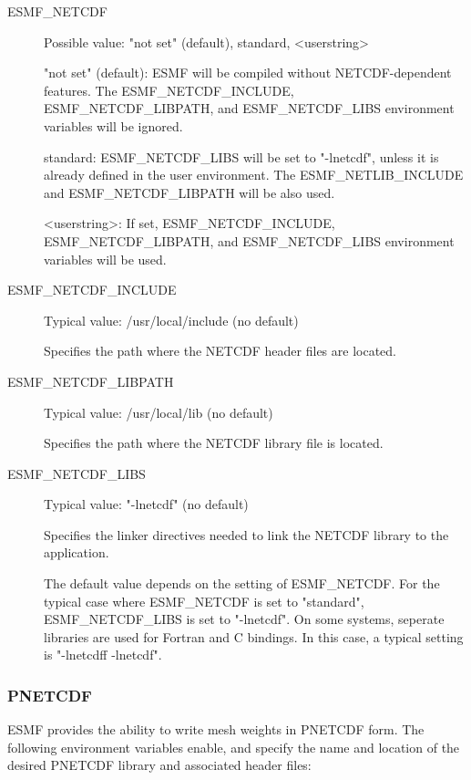 \begin{description}

\item[ESMF\_NETCDF] Possible value: "not set" (default), standard, <userstring>

"not set" (default): ESMF will be compiled without NETCDF-dependent features.
The ESMF\_NETCDF\_INCLUDE, ESMF\_NETCDF\_LIBPATH, and ESMF\_NETCDF\_LIBS
environment variables will be ignored.

standard: ESMF\_NETCDF\_LIBS will be set to "-lnetcdf", unless it is already
defined in the user environment.  The ESMF\_NETLIB\_INCLUDE and
ESMF\_NETCDF\_LIBPATH will be also used.

<userstring>: If set, ESMF\_NETCDF\_INCLUDE, ESMF\_NETCDF\_LIBPATH, and
ESMF\_NETCDF\_LIBS environment variables will be used.

\item[ESMF\_NETCDF\_INCLUDE] Typical value: /usr/local/include (no default)

Specifies the path where the NETCDF header files are located.

\item[ESMF\_NETCDF\_LIBPATH] Typical value: /usr/local/lib (no default)

Specifies the path where the NETCDF library file is located.

\item[ESMF\_NETCDF\_LIBS] Typical value: "-lnetcdf" (no default)

Specifies the linker directives needed to link the NETCDF library to
the application.

The default value depends on the setting of ESMF\_NETCDF.  For the
typical case where ESMF\_NETCDF is set to "standard", ESMF\_NETCDF\_LIBS
is set to "-lnetcdf".  On some systems, seperate libraries are used
for Fortran and C bindings.  In this case, a typical setting is
"-lnetcdff -lnetcdf".
\end{description}

\subsubsection{PNETCDF}
ESMF provides the ability to write mesh weights in PNETCDF form.  The
following environment variables enable, and specify the name and location
of the desired PNETCDF library and associated header files:

